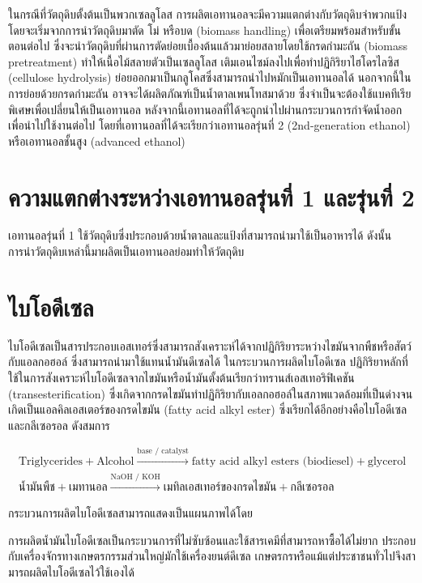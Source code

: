\documentclass[a4paper,nobib,openany]{tufte-book}
\begin{document}
ในกรณีที่วัตถุดิบตั้งต้นเป็นพวกเซลลูโลส
การผลิตเอทานอลจะมีความแตกต่างกับวัตถุดิบจำพวกแป้ง
โดยจะเริ่มจากการนำวัตถุดิบมาตัด โม่ หรือบด (biomass handling)
เพื่อเตรียมพร้อมสำหรับขั้นตอนต่อไป
ซึ่งจะนำวัตถุดิบที่ผ่านการตัดย่อยเบื้องต้นแล้วมาย่อยสลายโดยใช้กรดกำมะถัน
(biomass pretreatment) ทำให้เนื้อไม้สลายตัวเป็นเซลลูโลส
เติมเอนไซม์ลงไปเพื่อทำปฏิกิริยาไฮโดรไลซิส (cellulose hydrolysis)
ย่อยออกมาเป็นกลูโคสซึ่งสามารถนำไปหมักเป็นเอทานอลได้
นอกจากนี้ในการย่อยด้วยกรดกำมะถัน อาจจะได้ผลิตภัณฑ์เป็นน้ำตาลเพนโทสมาด้วย
ซึ่งจำเป็นจะต้องใช้แบคทีเรียพิเศษเพื่อเปลี่ยนให้เป็นเอทานอล
หลังจากนี้เอทานอลที่ได้จะถูกนำไปผ่านกระบวนการกำจัดน้ำออกเพื่อนำไปใช้งานต่อไป
โดยที่เอทานอลที่ได้จะเรียกว่าเอทานอลรุ่นที่ 2 (2nd-generation ethanol)
หรือเอทานอลชั้นสูง (advanced ethanol)

\section{ความแตกต่างระหว่างเอทานอลรุ่นที่ 1 และรุ่นที่ 2}
\label{sec:org23e86d9}
เอทานอลรุ่นที่ 1
ใช้วัตถุดิบซึ่งประกอบด้วยน้ำตาลและแป้งที่สามารถนำมาใช้เป็นอาหารได้
ดังนั้นการนำวัตถุดิบเหล่านี้มาผลิตเป็นเอทานอลย่อมทำให้วัตถุดิบ

\section{ไบโอดีเซล}
\label{sec:org5a37540}
ไบโอดีเซลเป็นสารประกอบเอสเทอร์ซึ่งสามารถสังเคราะห์ได้จากปฏิกิริยาระหว่างไขมันจากพืชหรือสัตว์กับแอลกอฮอล์
ซึ่งสามารถนำมาใช้แทนน้ำมันดีเซลได้ ในกระบวนการผลิตไบโอดีเซล
ปฏิกิริยาหลักที่ใช้ในการสังเคราะห์ไบโอดีเซลจากไขมันหรือน้ำมันตั้งต้นเรียกว่าทรานส์เอสเทอริฟิเคชัน
(transesterification)
ซึ่งเกิดจากกรดไขมันทำปฏิกิริยากับเอลกอฮอล์ในสภาพแวดล้อมที่เป็นด่างจนเกิดเป็นแอลคิลเอสเตอร์ของกรดไขมัน
(fatty acid alkyl ester) ซึ่งเรียกได้อีกอย่างคือไบโอดีเซล และกลีเซอรอล
ดังสมการ

\begin{gather}
\label{eq: transesterification}
  \text{Triglycerides} + \text{Alcohol} \xrightarrow{\text{base / catalyst}} \text{fatty acid alkyl esters (biodiesel)} + \text{glycerol} \\
  \text{น้ำมันพืช} + \text{เมทานอล} \xrightarrow{\text{NaOH / KOH}} \text{เมทิลเอสเทอร์ของกรดไขมัน} + \text{กลีเซอรอล}
\end{gather}

กระบวนการผลิตไบโอดีเซลสามารถแสดงเป็นแผนภาพได้โดย

การผลิตน้ำมันไบโอดีเซลเป็นกระบวนการที่ไม่ซับซ้อนและใช้สารเคมีที่สามารถหาซื้อได้ไม่ยาก
ประกอบกับเครื่องจักรทางเกษตรกรรมส่วนใหญ่มักใช้เครื่องยนต์ดีเซล
เกษตรกรหรือแม้แต่ประชาชนทั่วไปจึงสามารถผลิตไบโอดีเซลไว้ใช้เองได้
\end{document}
